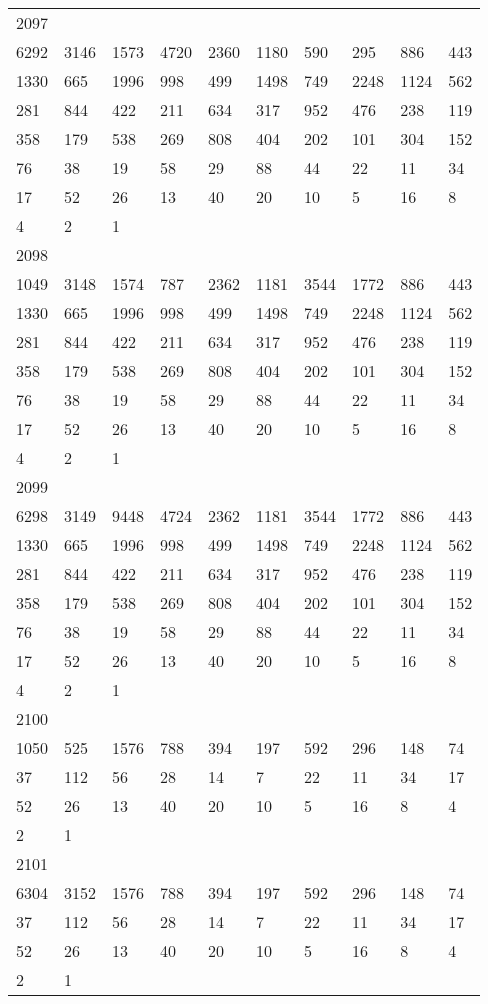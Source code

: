 \begin{longtable}{*{10}{l}}
2097&&&&&&&&&\\
6292& 3146& 1573& 4720& 2360& 1180& 590& 295& 886& 443\\
1330& 665& 1996& 998& 499& 1498& 749& 2248& 1124& 562\\
281& 844& 422& 211& 634& 317& 952& 476& 238& 119\\
358& 179& 538& 269& 808& 404& 202& 101& 304& 152\\
76& 38& 19& 58& 29& 88& 44& 22& 11& 34\\
17& 52& 26& 13& 40& 20& 10& 5& 16& 8\\
4& 2& 1& \\

2098&&&&&&&&&\\
1049& 3148& 1574& 787& 2362& 1181& 3544& 1772& 886& 443\\
1330& 665& 1996& 998& 499& 1498& 749& 2248& 1124& 562\\
281& 844& 422& 211& 634& 317& 952& 476& 238& 119\\
358& 179& 538& 269& 808& 404& 202& 101& 304& 152\\
76& 38& 19& 58& 29& 88& 44& 22& 11& 34\\
17& 52& 26& 13& 40& 20& 10& 5& 16& 8\\
4& 2& 1& \\

2099&&&&&&&&&\\
6298& 3149& 9448& 4724& 2362& 1181& 3544& 1772& 886& 443\\
1330& 665& 1996& 998& 499& 1498& 749& 2248& 1124& 562\\
281& 844& 422& 211& 634& 317& 952& 476& 238& 119\\
358& 179& 538& 269& 808& 404& 202& 101& 304& 152\\
76& 38& 19& 58& 29& 88& 44& 22& 11& 34\\
17& 52& 26& 13& 40& 20& 10& 5& 16& 8\\
4& 2& 1& \\

2100&&&&&&&&&\\
1050& 525& 1576& 788& 394& 197& 592& 296& 148& 74\\
37& 112& 56& 28& 14& 7& 22& 11& 34& 17\\
52& 26& 13& 40& 20& 10& 5& 16& 8& 4\\
2& 1& \\

2101&&&&&&&&&\\
6304& 3152& 1576& 788& 394& 197& 592& 296& 148& 74\\
37& 112& 56& 28& 14& 7& 22& 11& 34& 17\\
52& 26& 13& 40& 20& 10& 5& 16& 8& 4\\
2& 1& \\


\end{longtable}
